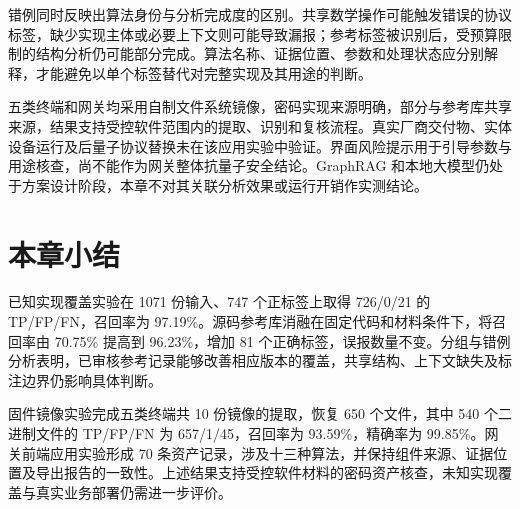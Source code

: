 错例同时反映出算法身份与分析完成度的区别。共享数学操作可能触发错误的协议标签，缺少实现主体或必要上下文则可能导致漏报；参考标签被识别后，受预算限制的结构分析仍可能部分完成。算法名称、证据位置、参数和处理状态应分别解释，才能避免以单个标签替代对完整实现及其用途的判断。

五类终端和网关均采用自制文件系统镜像，密码实现来源明确，部分与参考库共享来源，结果支持受控软件范围内的提取、识别和复核流程。真实厂商交付物、实体设备运行及后量子协议替换未在该应用实验中验证。界面风险提示用于引导参数与用途核查，尚不能作为网关整体抗量子安全结论。GraphRAG 和本地大模型仍处于方案设计阶段，本章不对其关联分析效果或运行开销作实测结论。

\section{本章小结}

已知实现覆盖实验在 1071 份输入、747 个正标签上取得 726/0/21 的 TP/FP/FN，召回率为 97.19\%。源码参考库消融在固定代码和材料条件下，将召回率由 70.75\% 提高到 96.23\%，增加 81 个正确标签，误报数量不变。分组与错例分析表明，已审核参考记录能够改善相应版本的覆盖，共享结构、上下文缺失及标注边界仍影响具体判断。

固件镜像实验完成五类终端共 10 份镜像的提取，恢复 650 个文件，其中 540 个二进制文件的 TP/FP/FN 为 657/1/45，召回率为 93.59\%，精确率为 99.85\%。网关前端应用实验形成 70 条资产记录，涉及十三种算法，并保持组件来源、证据位置及导出报告的一致性。上述结果支持受控软件材料的密码资产核查，未知实现覆盖与真实业务部署仍需进一步评价。

